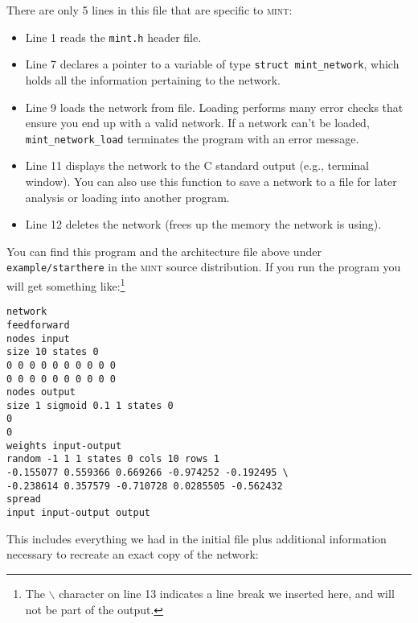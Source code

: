 \documentclass[12pt,letterpaper]{memoir}
\newcommand{\mint}{{\scshape\sffamily mint}\xspace}
\begin{document}
There are only 5 lines in this file that are specific to \mint:
\begin{itemize}
\item Line 1 reads the \lstinline{mint.h} header file.
\item Line 7 declares a pointer to a variable of type
  \lstinline{struct mint_network}, which holds all the information
  pertaining to the network.
\item Line 9 loads the network from file. Loading performs many error
  checks that ensure you end up with a valid network. If a network
  can't be loaded, \lstinline{mint_network_load} terminates the
  program with an error message.
\item Line 11 displays the network to the C standard output (e.g.,
  terminal window). You can also use this function to save a network
  to a file for later analysis or loading into another program.
\item Line 12 deletes the network (frees up the memory the network is
  using).
\end{itemize}
You can find this program and the architecture file above under
\lstinline{example/starthere} in the \mint source distribution. If you
run the program you will get something like:\footnote{The $\backslash$
  character on line 13 indicates a line break we inserted here, and
  will not be part of the output.}
\begin{lstlisting}
network
feedforward 
nodes input
size 10 states 0 
0 0 0 0 0 0 0 0 0 0 
0 0 0 0 0 0 0 0 0 0 
nodes output
size 1 sigmoid 0.1 1 states 0 
0 
0 
weights input-output
random -1 1 1 states 0 cols 10 rows 1 
-0.155077 0.559366 0.669266 -0.974252 -0.192495 \
-0.238614 0.357579 -0.710728 0.0285505 -0.562432 
spread
input input-output output 
\end{lstlisting}
This includes everything we had in the initial file plus additional
information necessary to recreate an exact copy of the network:
\end{document}
